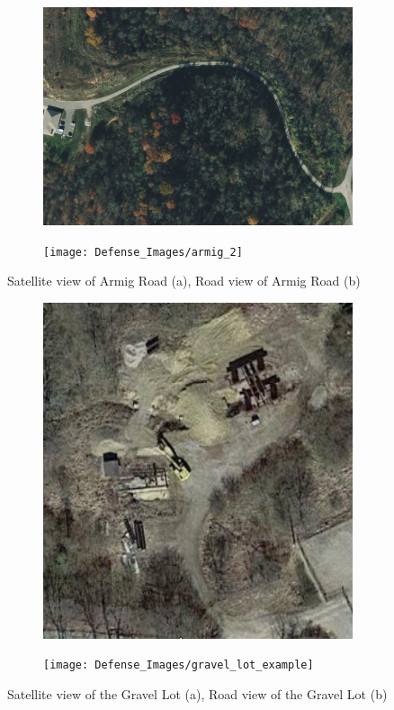 \documentclass[numbered,pdftex]{ohio-etd}
\begin{document}
{{{{				\begin{figure}[H]
					\centering
					\begin{subfigure}{0.45\textwidth}
						\centering
						\includegraphics[width=1.0\linewidth,height=5.0 cm,keepaspectratio]{Defense_Images/Gravel_Road_Armig}
						\caption[Armig Road Satellite View]{}
						\label{fig:Armig_Road_Sat_View}
					\end{subfigure}
					\begin{subfigure}{0.45\textwidth}
						\centering
						\texttt{[image: Defense\_Images/armig\_2]}
						\caption[Armig Road Camera View]{}
						\label{fig:Armig_Road_Camera_View}
					\end{subfigure}
					\caption[Armig Road]{Satellite view of Armig Road (a), Road view of Armig Road (b)}
					\label{fig:Combined_Armig}
				\end{figure}
			
				\begin{figure}[H]
					\centering
					\begin{subfigure}{0.45\textwidth}
						\centering
						\includegraphics[width=1.0\linewidth,height=5.0 cm,keepaspectratio]{Defense_Images/Gravel_Lot}
						\caption[Gravel Lot Satellite View]{}
						\label{fig:Gravel_Lot_Sat_View}
					\end{subfigure}
					\begin{subfigure}{0.45\textwidth}
						\centering
						\texttt{[image: Defense\_Images/gravel\_lot\_example]}
						\caption[Gravel Lot Camera View]{}
						\label{fig:Gravel_Lot_Camera_View}
					\end{subfigure}
					\caption[Gravel Lot]{Satellite view of the Gravel Lot (a), Road view of the Gravel Lot (b)}
					\label{fig:Combined_Gravel_Lot}
				\end{figure}
			
}}}}
\end{document}
